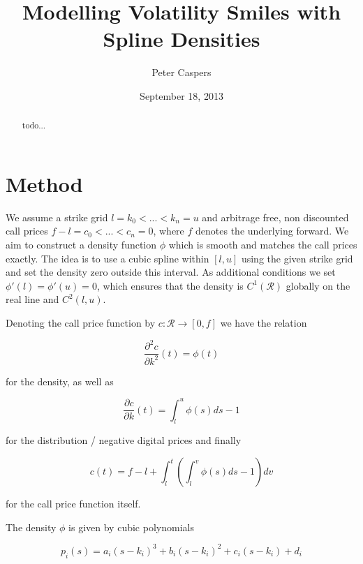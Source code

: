 \documentclass{amsart}
\theoremstyle{plain}
\numberwithin{equation}{section}
\begin{document}
\title{Modelling Volatility Smiles with Spline Densities}
\author{Peter Caspers}
\date{September 18, 2013}
\maketitle

\begin{abstract}
todo...
\end{abstract}

\section{Method}

We assume a strike grid $l=k_0 < ... < k_n=u$ and arbitrage free, non discounted call prices $f-l = c_0 < ... < c_n = 0$, where $f$ denotes the underlying forward. We aim to construct a density function $\phi$ which is smooth and matches the call prices exactly. The idea is to use a cubic spline within $[l,u]$ using the given strike grid and set the density zero outside this interval. As additional conditions we set $\phi'(l) = \phi'(u) = 0$, which ensures that the density is $C^1(\mathcal{R})$ globally on the real line and $C^2(l,u)$.

Denoting the call price function by $c:\mathcal{R}\rightarrow[0,f]$ we have the relation

\begin{equation}
\frac{\partial^2 c}{\partial k^2} (t) = \phi(t)
\end{equation}

for the density, as well as

\begin{equation}
\frac{\partial c}{\partial k} (t) = \int_{l}^{u} \phi(s) ds - 1
\end{equation}

for the distribution / negative digital prices and finally

\begin{equation}\label{integralC}
c(t) = f - l + \int_{l}^{t} \left( \int_{l}^{v} \phi(s) ds -1 \right) dv
\end{equation}

for the call price function itself.

The density $\phi$ is given by cubic polynomials

\begin{equation}
p_i(s) = a_i (s-k_i)^3 + b_i (s-k_i)^2 + c_i (s-k_i) + d_i
\end{equation}
\end{document}
